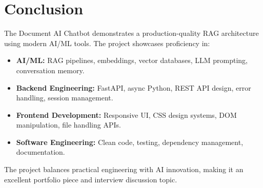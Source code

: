 \documentclass[12pt,a4paper]{article}
\begin{document}
\section{Conclusion}

The Document AI Chatbot demonstrates a production-quality RAG architecture using modern AI/ML tools. The project showcases proficiency in:

\begin{itemize}
  \item \textbf{AI/ML:} RAG pipelines, embeddings, vector databases, LLM prompting, conversation memory.
  \item \textbf{Backend Engineering:} FastAPI, async Python, REST API design, error handling, session management.
  \item \textbf{Frontend Development:} Responsive UI, CSS design systems, DOM manipulation, file handling APIs.
  \item \textbf{Software Engineering:} Clean code, testing, dependency management, documentation.
\end{itemize}

The project balances practical engineering with AI innovation, making it an excellent portfolio piece and interview discussion topic.
\end{document}
